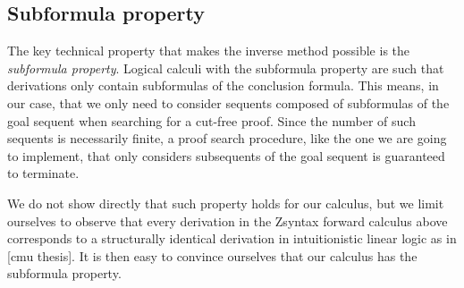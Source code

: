 

\subsection{Subformula property}

The key technical property that makes the inverse method possible is the
\emph{subformula property}. Logical calculi with the subformula property are
such that derivations only contain subformulas of the conclusion formula. This
means, in our case, that we only need to consider sequents composed of
subformulas of the goal sequent when searching for a cut-free proof. Since the
number of such sequents is necessarily finite, a proof search procedure, like the
one we are going to implement, that only considers subsequents of the goal
sequent is guaranteed to terminate.

We do not show directly that such property holds for our calculus, but we limit
ourselves to observe that every derivation in the Zsyntax forward calculus above
corresponds to a structurally identical derivation in intuitionistic linear
logic as in [cmu thesis]. It is then easy to convince ourselves that our
calculus has the subformula property.

